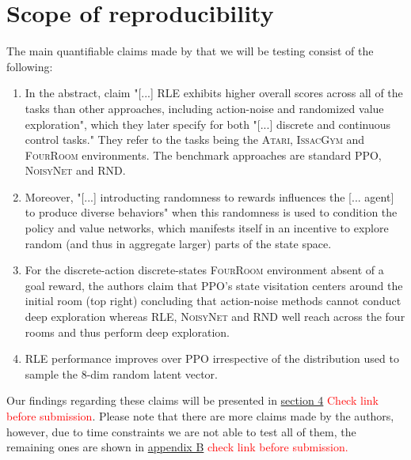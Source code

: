 \documentclass[10pt]{article} %
\begin{document}
\newpage
\section{Scope of reproducibility}
\label{sec:claims}

The main quantifiable claims made by \cite{rle-paper} that we will be testing consist of the following:

\begin{enumerate}
    \item In the abstract, \cite{rle-paper} claim "[...] \textsc{RLE} exhibits higher overall scores across all of the tasks than other approaches, including action-noise and randomized value exploration", which they later specify for both "[...] discrete and continuous control tasks." They refer to the tasks being the \textsc{Atari}, \textsc{IssacGym} and \textsc{FourRoom} environments. The benchmark approaches are standard \textsc{PPO}, \textsc{NoisyNet} and \textsc{RND}.
    \item Moreover, "[...] introducting randomness to rewards influences the [... agent] to produce diverse behaviors" \citep{rle-paper} when this randomness is used to condition the policy and value networks, which manifests itself in an incentive to explore random (and thus in aggregate larger) parts of the state space.
    \item For the discrete-action discrete-states \textsc{FourRoom} environment absent of a goal reward, the authors claim that \textsc{PPO}'s state visitation centers around the initial room (top right) concluding that action-noise methods cannot conduct deep exploration whereas \textsc{RLE}, \textsc{NoisyNet} and \textsc{RND} well reach across the four rooms and thus perform deep exploration.
    \item \textsc{RLE} performance improves over \textsc{PPO} irrespective of the distribution used to sample the $8$-dim random latent vector.
\end{enumerate}

\noindent Our findings regarding these claims will be presented in \hyperlink{sec4}{section 4} \textcolor{red}{Check link before submission}. Please note that there are more claims made by the authors, however, due to time constraints we are not able to test all of them, the remaining ones are shown in \hyperlink{untested-claims}{appendix B} \textcolor{red}{check link before submission.}
\end{document}
